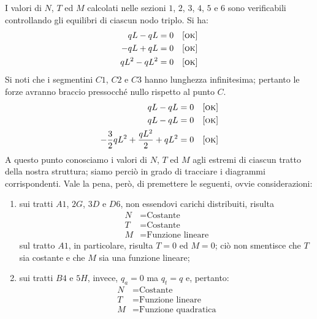 I valori di $N$, $T$ ed $M$ calcolati nelle sezioni $1$, $2$, $3$, $4$, $5$ e $6$ sono verificabili controllando gli equilibri di ciascun nodo triplo. Si ha:
\begin{align*}
qL - qL              &= 0 \quad [\textsc{ok}] \\ 
-qL + qL            &= 0 \quad [\textsc{ok}] \\
qL^{2} - qL^{2} &= 0 \quad [\textsc{ok}] 
\end{align*}
Si noti che i segmentini $C1$, $C2$ e $C3$ hanno lunghezza infinitesima; pertanto le forze avranno braccio pressocché nullo rispetto al punto $C$. 
\begin{align*}
qL - qL              &= 0 \quad [\textsc{ok}] \\ 
qL - qL            &= 0 \quad [\textsc{ok}] \\
-\frac{3}{2}qL^{2} + \frac{qL^{2}}{2} + qL^{2} &= 0 \quad [\textsc{ok}] 
\end{align*}
A questo punto conosciamo i valori di $N$, $T$ ed $M$ agli estremi di ciascun tratto della nostra struttura; siamo perciò in grado di tracciare i diagrammi corrispondenti. Vale la pena, però, di premettere le seguenti, ovvie considerazioni:
\begin{enumerate}
\item sui tratti $A1$, $2G$, $3D$ e $D6$, non essendovi carichi distribuiti, risulta
\begin{align*}
N &= \text{Costante} \\ 
T &= \text{Costante} \\
M &= \text{Funzione lineare}
\end{align*}
sul tratto $A1$, in particolare, risulta $T=0$ ed $M=0$; ciò non smentisce che $T$ sia costante e che $M$ sia una funzione lineare; 
\item sui tratti $B4$ e $5H$, invece, $q_{a} = 0$ ma $q_{t} = q$ e, pertanto: 
\begin{align*}
N &= \text{Costante} \\ 
T &= \text{Funzione lineare} \\
M &= \text{Funzione quadratica}
\end{align*}
\end{enumerate}
